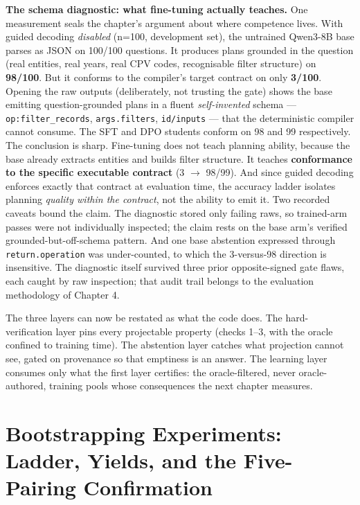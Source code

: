\documentclass[10pt]{article} %
\begin{document}
\textbf{The schema diagnostic: what fine-tuning actually teaches.} One measurement seals the chapter's argument about where competence lives. With guided decoding \emph{disabled} (n=100, development set), the untrained Qwen3-8B base parses as JSON on 100/100 questions. It produces plans grounded in the question (real entities, real years, real CPV codes, recognisable filter structure) on \textbf{98/100}. But it conforms to the compiler's target contract on only \textbf{3/100}. Opening the raw outputs (deliberately, not trusting the gate) shows the base emitting question-grounded plans in a fluent \emph{self-invented} schema --- \texttt{op:filter\_records}, \texttt{args.filters}, \texttt{id/inputs} --- that the deterministic compiler cannot consume. The SFT and DPO students conform on 98 and 99 respectively. The conclusion is sharp. Fine-tuning does not teach planning ability, because the base already extracts entities and builds filter structure. It teaches \textbf{conformance to the specific executable contract} (3 $\rightarrow$ 98/99). And since guided decoding enforces exactly that contract at evaluation time, the accuracy ladder isolates planning \emph{quality within the contract}, not the ability to emit it. Two recorded caveats bound the claim. The diagnostic stored only failing raws, so trained-arm passes were not individually inspected; the claim rests on the base arm's verified grounded-but-off-schema pattern. And one base abstention expressed through \texttt{return.operation} was under-counted, to which the 3-versus-98 direction is insensitive. The diagnostic itself survived three prior opposite-signed gate flaws, each caught by raw inspection; that audit trail belongs to the evaluation methodology of Chapter 4.

The three layers can now be restated as what the code does. The hard-verification layer pins every projectable property (checks 1--3, with the oracle confined to training time). The abstention layer catches what projection cannot see, gated on provenance so that emptiness is an answer. The learning layer consumes only what the first layer certifies: the oracle-filtered, never oracle-authored, training pools whose consequences the next chapter measures.

\section{Bootstrapping Experiments: Ladder, Yields, and the Five-Pairing Confirmation}\label{sec:chapter-6-bootstrapping-experiments-ladd}
\end{document}
